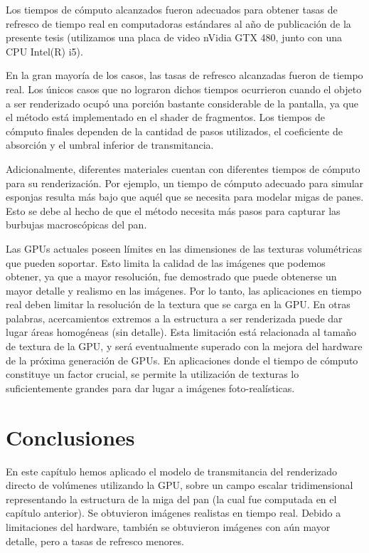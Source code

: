 
Los tiempos de cómputo alcanzados fueron adecuados para obtener tasas de refresco de tiempo real en computadoras estándares al año de publicación de la presente tesis (utilizamos una placa de video nVidia GTX 480, junto con una \acrshort{CPU} Intel(R) i5).

En la gran mayoría de los casos, las tasas de refresco alcanzadas fueron de tiempo real.
Los únicos casos que no lograron dichos tiempos ocurrieron cuando el objeto a ser renderizado ocupó una porción bastante considerable de la pantalla, ya que el método está implementado en el shader de fragmentos.
Los tiempos de cómputo finales dependen de la cantidad de pasos utilizados, el coeficiente de absorción y el umbral inferior de transmitancia.

Adicionalmente, diferentes materiales cuentan con diferentes tiempos de cómputo para su renderización.
Por ejemplo, un tiempo de cómputo adecuado para simular esponjas resulta más bajo que aquél que se necesita para modelar migas de panes.
Esto se debe al hecho de que el método necesita más pasos para capturar las burbujas macroscópicas del pan.

Las GPUs actuales poseen límites en las dimensiones de las texturas volumétricas que pueden soportar.
Esto limita la calidad de las imágenes que podemos obtener, ya que a mayor resolución, fue demostrado que puede obtenerse un mayor detalle y realismo en las imágenes.
Por lo tanto, las aplicaciones en tiempo real deben limitar la resolución de la textura que se carga en la GPU.
En otras palabras, acercamientos extremos a la estructura a ser renderizada puede dar lugar áreas homogéneas (sin detalle).
Esta limitación está relacionada al tamaño de textura de la GPU, y será eventualmente superado con la mejora del hardware de la próxima generación de GPUs.
En aplicaciones donde el tiempo de cómputo constituye un factor crucial, se permite la utilización de texturas lo suficientemente grandes para dar lugar a imágenes foto-realísticas.

\section{Conclusiones}

En este capítulo hemos aplicado el modelo de transmitancia del renderizado directo de volúmenes utilizando la GPU, sobre un campo escalar tridimensional representando la estructura de la miga del pan (la cual fue computada en el capítulo anterior).
Se obtuvieron imágenes realistas en tiempo real.
Debido a limitaciones del hardware, también se obtuvieron imágenes con aún mayor detalle, pero a tasas de refresco menores.

